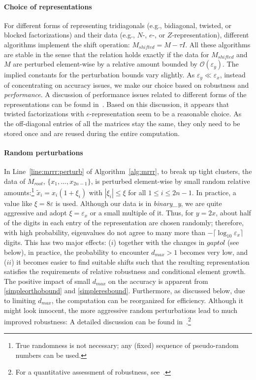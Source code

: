\documentclass[final]{siamltex}
\newcommand\order[1]{\mathcal{O}(#1)}
\newcommand{\binaryy}{{\it binary\_\hspace*{0pt}y}}
\begin{document}
\paragraph{Choice of representations} For different forms
of representing tridiagonals (e.g., bidiagonal, twisted, or blocked factorizations) and their
data (e.g., $N$-, $e$-, or $Z$-representation), different algorithms
implement the shift operation: $M_{shifted} = M - \tau I$. All these
algorithms are stable in the sense that the relation holds 
exactly if the data for $M_{shifted}$ and $M$ are perturbed element-wise by a
relative amount bounded by $\order{\varepsilon_y}$. The implied constants
for the perturbation bounds vary slightly. As $\varepsilon_y \ll
\varepsilon_x$, instead of concentrating on accuracy issues, we make our
choice based on robustness and {\it performance}. A discussion of performance
issues related to different forms of the representations can be found
in~\cite{Willems:twisted,Willems:Diss}. Based on this discussion, it appears
that twisted factorizations with $e$-representation seem to be a reasonable
choice. As the off-diagonal entries of all the matrices stay the same, they
only need to be stored once and are reused during the entire
computation. 

\paragraph{Random perturbations} In Line~\ref{line:mrrr:perturb} of
Algorithm~\ref{alg:mrrr}, to break up tight clusters, the data of 
$M_{root}$, $\{x_1,...,x_{2n-1}\}$, is perturbed element-wise by small
random relative amounts:\footnote{True randomness is not necessary; any
  (fixed) sequence of pseudo-random numbers can be used.} 
$\tilde{x}_i = x_i (1 + \xi_i)$ with $|\xi_i| \leq \xi$ for all $1 \leq i
\leq {2n-1}$. In practice, a value like $\xi = 8
\varepsilon$ is used. Although our data is in \binaryy, we are quite
aggressive and adopt $\xi = \varepsilon_x$ or a small multiple
of it. Thus, for $y = 2x$, about half of the digits in each entry of the representation are chosen
randomly; therefore, with high probability, eigenvalues do not agree to
many more than $-\lceil\log_{10} \varepsilon_x\rceil$ digits.
This has two major effects: ($i$) together with the changes in
$gaptol$ (see below), in practice, the probability to encounter $d_{max} > 1$ 
becomes very low, and ($ii$) it becomes easier to find suitable shifts such that the
resulting representation satisfies the requirements of relative robustness
and conditional element growth. The positive impact of small 
$d_{max}$ on the accuracy is apparent from \eqref{simpleorthobound}
and \eqref{simpleresbound}. Furthermore, as 
discussed below, due to limiting $d_{max}$, the computation can be
reorganized for efficiency. Although it might look innocent, the more
aggressive random perturbations lead to much improved robustness: A detailed
discussion can be found in~\cite{Dhillon05gluedmatrices}.\footnote{For a quantitative
  assessment of robustness, see~\cite{mydiss}.} 
\end{document}
